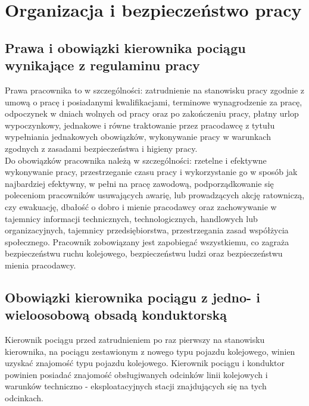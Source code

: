 \part{Organizacja i bezpieczeństwo pracy}
\chapter{Prawa i obowiązki kierownika pociągu wynikające z regulaminu pracy}
Prawa pracownika to w szczególności:
zatrudnienie na stanowisku pracy zgodnie z umową o pracę i posiadanymi kwalifikacjami, terminowe wynagrodzenie za pracę, odpoczynek w dniach wolnych od pracy oraz po zakończeniu pracy, płatny urlop wypoczynkowy, jednakowe i równe traktowanie przez pracodawcę z tytułu wypełniania jednakowych obowiązków, wykonywanie pracy w warunkach zgodnych z zasadami bezpieczeństwa i higieny pracy.
\\Do obowiązków pracownika należą w szczególności:
rzetelne i efektywne wykonywanie pracy, przestrzeganie czasu pracy i wykorzystanie go w sposób jak najbardziej efektywny, w pełni na pracę zawodową, podporządkowanie się poleceniom pracowników usuwających awarię, lub prowadzących akcję ratowniczą, czy ewakuację, dbałość o dobro i mienie pracodawcy oraz zachowywanie w tajemnicy informacji technicznych, technologicznych, handlowych lub organizacyjnych, tajemnicy przedsiębiorstwa, przestrzegania zasad współżycia społecznego. Pracownik zobowiązany jest zapobiegać wszystkiemu, co zagraża bezpieczeństwu ruchu kolejowego, bezpieczeństwu ludzi oraz bezpieczeństwu mienia pracodawcy. 

\chapter{Obowiązki kierownika pociągu z jedno- i wieloosobową obsadą konduktorską}

Kierownik pociągu przed zatrudnieniem po raz pierwszy na stanowisku kierownika, na pociągu zestawionym z nowego typu pojazdu kolejowego, winien
uzyskać znajomość typu pojazdu kolejowego. Kierownik pociągu i konduktor powinien posiadać znajomość obsługiwanych odcinków linii kolejowych i warunków techniczno - eksploatacyjnych stacji znajdujących się na tych odcinkach.

